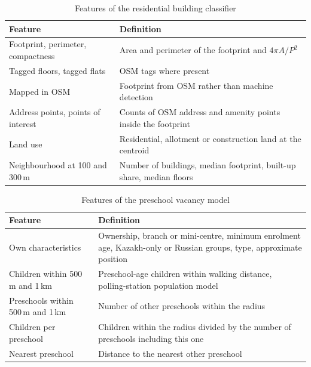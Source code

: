 \begin{table}[ht]
\centering
\caption{Features of the residential building classifier}
\small
\begin{tabularx}{\textwidth}{>{\raggedright\arraybackslash}p{4.5cm}X}
\toprule
Feature & Definition \\
\midrule
Footprint, perimeter, compactness & Area and perimeter of the footprint and $4\pi A/P^2$ \\
Tagged floors, tagged flats & OSM tags where present \\
Mapped in OSM & Footprint from OSM rather than machine detection \\
Address points, points of interest & Counts of OSM address and amenity points inside the footprint \\
Land use & Residential, allotment or construction land at the centroid \\
Neighbourhood at 100 and 300\,m & Number of buildings, median footprint, built-up share, median floors \\
\bottomrule
\end{tabularx}
\end{table}

\begin{table}[ht]
\centering
\caption{Features of the preschool vacancy model}
\small
\begin{tabularx}{\textwidth}{>{\raggedright\arraybackslash}p{4.5cm}X}
\toprule
Feature & Definition \\
\midrule
Own characteristics & Ownership, branch or mini-centre, minimum enrolment age, Kazakh-only or Russian groups, type, approximate position \\
Children within 500\,m and 1\,km & Preschool-age children within walking distance, polling-station population model \\
Preschools within 500\,m and 1\,km & Number of other preschools within the radius \\
Children per preschool & Children within the radius divided by the number of preschools including this one \\
Nearest preschool & Distance to the nearest other preschool \\
\bottomrule
\end{tabularx}
\end{table}


